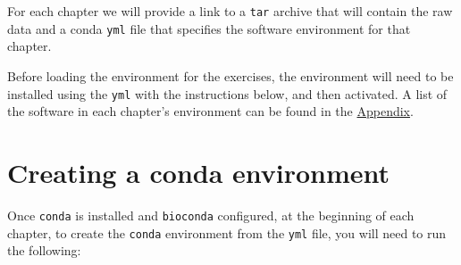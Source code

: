 \documentclass[
  letterpaper,
]{book}
\begin{document}
For each chapter we will provide a link to a \texttt{tar} archive that
will contain the raw data and a conda \texttt{yml} file that specifies
the software environment for that chapter.

Before loading the environment for the exercises, the environment will
need to be installed using the \texttt{yml} with the instructions below,
and then activated. A list of the software in each chapter's environment
can be found in the \protect\hyperlink{conda-environments}{Appendix}.

\hypertarget{creating-a-conda-environment}{%
\section*{Creating a conda
environment}\label{creating-a-conda-environment}}


Once \texttt{conda} is installed and \texttt{bioconda} configured, at
the beginning of each chapter, to create the \texttt{conda} environment
from the \texttt{yml} file, you will need to run the following:
\end{document}
